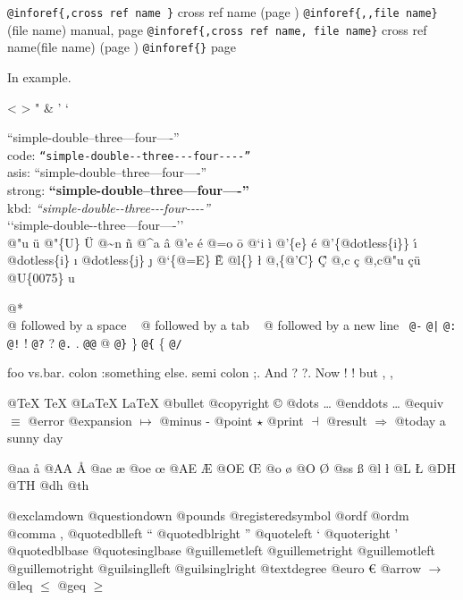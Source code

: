 \documentclass{book}
\begin{document}
\texttt{@inforef\{,cross ref name \}} cross ref name (page \pageref{anchor:})
\texttt{@inforef\{,,file name\}} (file name) manual, page \pageref{anchor:}
\texttt{@inforef\{,cross ref name, file name\}} cross ref name(file name) (page \pageref{anchor:})
\texttt{@inforef\{\}} page \pageref{anchor:}



In example.

<
>
"
\&
'
`

``simple-double--three---four----''\leavevmode{}\\
code: \texttt{``simple-double{-}{-}three{-}{-}{-}four{-}{-}{-}-''} \leavevmode{}\\
asis: ``simple-double--three---four----'' \leavevmode{}\\
strong: \textbf{``simple-double--three---four----''} \leavevmode{}\\
kbd: {\ttfamily\textsl{``simple-double{-}{-}three{-}{-}{-}four{-}{-}{-}-''}} \leavevmode{}\\

`\hbox{}`simple-double-\hbox{}-three---four----'\hbox{}'\leavevmode{}\\


@"u \"{u} 
@"\{U\} \"{U} 
@\~{}n \~{n}
@\^{}a \^{a}
@'e \'{e}
@=o \={o}
@`i \`{i}
@'\{e\} \'{e}
@'\{@dotless\{i\}\} \'{\i{}} 
@dotless\{i\} \i{}
@dotless\{j\} \j{}
@`\{@=E\} \`{\={E}} 
@l\{\} \l{}
@,\{@'C\} \c{\'{C}}
@,c \c{c}
@,c@"u \c{c}\"{u} \leavevmode{}\\

@U\{0075\} u

@* \leavevmode{}\\
@ followed by a space
\ {}
@ followed by a tab
\ {}
@ followed by a new line
\ {}\texttt{@-} \-{}
\texttt{@|} 
\texttt{@:} \@
\texttt{@!} \@!
\texttt{@?} \@?
\texttt{@.} \@.
\texttt{@@} @
\texttt{@\}} \}
\texttt{@\{} \{
\texttt{@/} 

foo vs.\@ bar. 
colon :\@And something else.
semi colon ;\@.
And ? ?\@.
Now ! !\@@
but , ,\@

@TeX \TeX{}
@LaTeX \LaTeX{}
@bullet \textbullet{}
@copyright \copyright{}
@dots \dots{}\@
@enddots \dots{}
@equiv $\equiv{}$
@error 
@expansion $\mapsto{}$
@minus -
@point $\star{}$
@print $\dashv{}$
@result $\Rightarrow{}$
@today a sunny day

@aa \aa{}
@AA \AA{}
@ae \ae{}
@oe \oe{}
@AE \AE{}
@OE \OE{}
@o \o{}
@O \O{}
@ss \ss{}
@l \l{}
@L \L{}
@DH \DH{}
@TH \TH{}
@dh \dh{}
@th \th{}

@exclamdown \textexclamdown{}
@questiondown \textquestiondown{}
@pounds \textsterling{}
@registeredsymbol \circledR{}
@ordf \textordfeminine{}
@ordm \textordmasculine{}
@comma ,
@quotedblleft \textquotedblleft{}
@quotedblright \textquotedblright{}
@quoteleft \textquoteleft{}
@quoteright \textquoteright{}
@quotedblbase \quotedblbase{}
@quotesinglbase \quotesinglbase{}
@guillemetleft \guillemotleft{}
@guillemetright \guillemotright{}
@guillemotleft \guillemotleft{}
@guillemotright \guillemotright{}
@guilsinglleft \guilsinglleft{}
@guilsinglright \guilsinglright{}
@textdegree \textdegree{}
@euro \euro{}
@arrow $\rightarrow{}$
@leq $\leq{}$
@geq $\geq{}$
\end{document}
